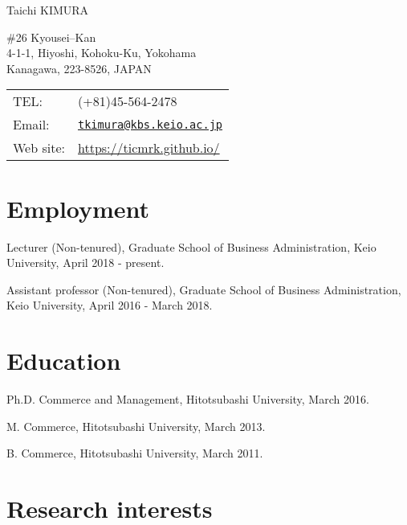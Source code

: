 \documentclass[letterpaper,uplatex]{article}
\def\name{Taichi KIMURA}
\renewenvironment{itemize}{
  \begin{list}{}{
    \setlength{\leftmargin}{1.5em}
  }
}{
  \end{list}
}
\begin{document}
{\LARGE \name}


\vspace{0.25in}

\begin{minipage}{0.45\linewidth}
  \#26 Kyousei--Kan \\
  4-1-1, Hiyoshi, Kohoku-Ku, Yokohama \\
  Kanagawa, 223-8526, JAPAN
\end{minipage}
\begin{minipage}{0.45\linewidth}
  \begin{tabular}{ll}
    TEL: & (+81)45-564-2478 \\
    Email: & \href{mailto:tkimura@kbs.keio.ac.jp}{\tt tkimura@kbs.keio.ac.jp}\\
    Web site: & \url{https://ticmrk.github.io/}
  \end{tabular}
\end{minipage}

\section*{Employment}

\begin{itemize}
     \item Lecturer (Non-tenured), Graduate School of Business Administration, Keio University, April 2018 - present.
     \item Assistant professor (Non-tenured), Graduate School of Business Administration, Keio University, April 2016 - March 2018.
\end{itemize}

\section*{Education}

\begin{itemize}
  \item Ph.D. Commerce and Management, Hitotsubashi University, March 2016.
  \item M. Commerce, Hitotsubashi University, March 2013.
  \item B. Commerce, Hitotsubashi University, March 2011.
\end{itemize}

\section*{Research interests}
\end{document}
